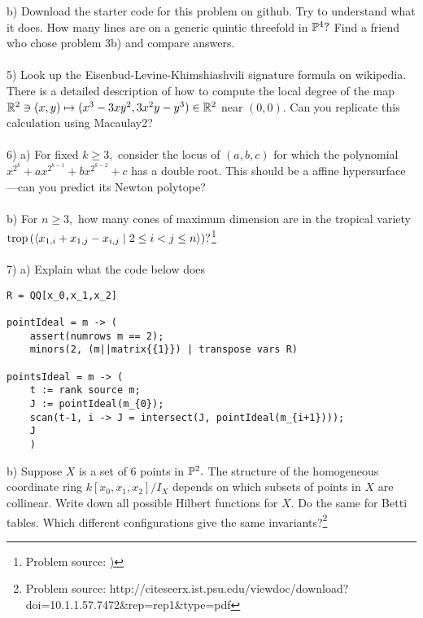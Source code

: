\documentclass{article}
\begin{document}
b) Download the starter code for this problem on github. Try to understand what it does. How many lines are on a generic quintic threefold in $\mathbb{P}^4?$ Find a friend who chose problem 3b) and compare answers.\\\\
5) Look up the Eisenbud-Levine-Khimshiashvili signature formula on wikipedia. There is a detailed description of how to compute the local degree of the map $\mathbb{R}^2 \ni (x,y) \mapsto (x^3 - 3 x y^2, 3 x^2 y - y^3) \in \mathbb{R}^2$ near $(0,0).$ Can you replicate this calculation using Macaulay2?\\\\
6) a) For fixed $k\ge 3,$ consider the locus of $(a,b,c)$ for which the polynomial $x^{2^k} + a x^{2^{k-1}} + b x^{2^{k-2}} + c$ has a double root. This should be a affine hypersurface---can you predict its Newton polytope?\\\\
b) For $n\ge 3,$ how many cones of maximum dimension are in the tropical variety $\operatorname{\rm trop} \left( \langle x_{1, i} + x_{1,j } - x_{i, j} \mid 2 \le i < j \le n \rangle \right)? $\footnote{Problem source:  \hyperlink{https://icerm.brown.edu/programs/sp-f18/w4/files/day1/Problems-by-Diane.pdf})}\\\\
7) a) Explain what the code below does 
\begin{verbatim}
R = QQ[x_0,x_1,x_2]

pointIdeal = m -> (
    assert(numrows m == 2);
    minors(2, (m||matrix{{1}}) | transpose vars R)

pointsIdeal = m -> (
    t := rank source m;
    J := pointIdeal(m_{0});
    scan(t-1, i -> J = intersect(J, pointIdeal(m_{i+1})));
    J
    )
\end{verbatim}
b) Suppose $X$ is a set of $6$ points in $\mathbb{P}^2.$ The structure of the homogeneous coordinate ring $k[x_0,x_1,x_2]/I_X$ depends on which subsets of points in $X$ are collinear. Write down all possible Hilbert functions for $X.$ Do the same for Betti tables. Which different configurations give the same invariants?\footnote{Problem source: http://citeseerx.ist.psu.edu/viewdoc/download?doi=10.1.1.57.7472&rep=rep1&type=pdf}
\end{document}
